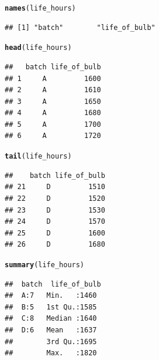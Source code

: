 \documentclass[11pt, a4paper]{article}\usepackage[]{graphicx}\usepackage[]{xcolor}
\makeatletter
\newcommand{\hlstd}[1]{\textcolor[rgb]{0.345,0.345,0.345}{#1}}%
\newcommand{\hlkwd}[1]{\textcolor[rgb]{0.737,0.353,0.396}{\textbf{#1}}}%
\newenvironment{kframe}{%
 \def\at@end@of@kframe{}%
 \ifinner\ifhmode%
  \def\at@end@of@kframe{\end{minipage}}%
  \begin{minipage}{\columnwidth}%
 \fi\fi%
 \def\FrameCommand##1{\hskip\@totalleftmargin \hskip-\fboxsep
 \colorbox{shadecolor}{##1}\hskip-\fboxsep
     \hskip-\linewidth \hskip-\@totalleftmargin \hskip\columnwidth}%
 \MakeFramed {\advance\hsize-\width
   \@totalleftmargin\z@ \linewidth\hsize
   \@setminipage}}%
 {\par\unskip\endMakeFramed%
 \at@end@of@kframe}
\newenvironment{knitrout}{}{} %
\makeatother
\begin{document}
\begin{knitrout}
\color{fgcolor}\begin{kframe}
\begin{alltt}
\hlkwd{names}\hlstd{(life_hours)}
\end{alltt}
\begin{verbatim}
## [1] "batch"        "life_of_bulb"
\end{verbatim}
\end{kframe}
\end{knitrout}

\begin{knitrout}
\color{fgcolor}\begin{kframe}
\begin{alltt}
\hlkwd{head}\hlstd{(life_hours)}
\end{alltt}
\begin{verbatim}
##   batch life_of_bulb
## 1     A         1600
## 2     A         1610
## 3     A         1650
## 4     A         1680
## 5     A         1700
## 6     A         1720
\end{verbatim}
\end{kframe}
\end{knitrout}

\begin{knitrout}
\color{fgcolor}\begin{kframe}
\begin{alltt}
\hlkwd{tail}\hlstd{(life_hours)}
\end{alltt}
\begin{verbatim}
##    batch life_of_bulb
## 21     D         1510
## 22     D         1520
## 23     D         1530
## 24     D         1570
## 25     D         1600
## 26     D         1680
\end{verbatim}
\end{kframe}
\end{knitrout}


\begin{knitrout}
\color{fgcolor}\begin{kframe}
\begin{alltt}
\hlkwd{summary}\hlstd{(life_hours)}
\end{alltt}
\begin{verbatim}
##  batch  life_of_bulb 
##  A:7   Min.   :1460  
##  B:5   1st Qu.:1585  
##  C:8   Median :1640  
##  D:6   Mean   :1637  
##        3rd Qu.:1695  
##        Max.   :1820
\end{verbatim}
\end{kframe}
\end{knitrout}
\end{document}
